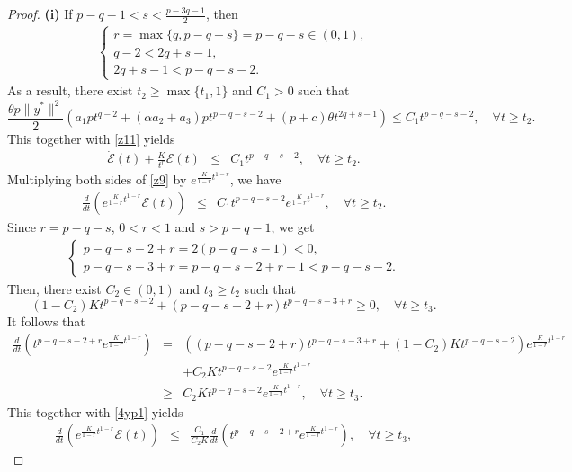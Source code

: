 \documentclass[review]{elsarticle}
\begin{document}
\begin{proof}
		{\bf (i)} If $p-q-1<s<\frac{p-3q-1}{2}$, then
		\begin{eqnarray*}
			\begin{cases}r=\max\{q, p-q-s\}=p-q-s\in (0,1),\\
				q-2<2q+s-1,\\
				2q+s-1<  p-q-s-2.
			\end{cases}
		\end{eqnarray*} 
As a result, there exist $t_2\geq\max\{t_1, 1\}$  and $C_1>0$ such that
		$$\frac{\theta p\|y^*\|^2}{2}\left(a_1pt^{q-2}+(\alpha a_2+a_3)pt^{p-q-s-2}+(p+c)\theta t^{2q+s-1}\right)\leq C_1t^{p-q-s-2}, \quad \forall t\geq t_2.$$
		This together with \eqref{z11} yields
		\begin{eqnarray}\label{z9}
			\dot{\mathcal{E}}(t)+\frac{K}{t^r}\mathcal{E}(t)
			&\leq&C_1 t^{p-q-s-2}, \quad \forall t\geq t_2.
		\end{eqnarray}	
		Multiplying both sides of \eqref{z9} by $e^{\frac{K}{1-r}t^{1-r}}$, we have 
		\begin{eqnarray}\label{4yp1}
			\frac{d}{dt}\left(e^{\frac{K}{1-r}t^{1-r}}\mathcal{E}(t)\right)
			&\leq&C_1 t^{p-q-s-2}e^{\frac{K}{1-r}t^{1-r}}, \quad \forall t\geq t_2.
		\end{eqnarray}	
		Since $r=p-q-s$, $0<r<1$ and $s>p-q-1$, we get
		\begin{eqnarray}\label{z10}
			\begin{cases}
				p-q-s-2+r=2(p-q-s-1)<0,\\
				p-q-s-3+r=p-q-s-2+r-1< p-q-s-2.
			\end{cases}
		\end{eqnarray} 
		Then, there exist  $C_2\in(0,1)$ and $t_3\geq t_2$ such that
		$$(1-C_2)Kt^{p-q-s-2}+(p-q-s-2+r)t^{p-q-s-3+r}\geq0, \quad \forall t\geq t_3.$$
	It follows that
		\begin{eqnarray*}
			\frac{d}{dt}\left(t^{p-q-s-2+r}e^{\frac{K}{1-r}t^{1-r}}\right)&=&\left((p-q-s-2+r)t^{p-q-s-3+r}+(1-C_2)Kt^{p-q-s-2}\right)e^{\frac{K}{1-r}t^{1-r}}\\
			&&+C_2Kt^{p-q-s-2}e^{\frac{K}{1-r}t^{1-r}}\\
			&\geq& C_2Kt^{p-q-s-2}e^{\frac{K}{1-r}t^{1-r}}, \quad \forall t\geq t_3.
		\end{eqnarray*}	
	This together with  \eqref{4yp1} yields
		\begin{eqnarray*}
			\frac{d}{dt}\left(e^{\frac{K}{1-r}t^{1-r}}\mathcal{E}(t)\right)
			&\leq&\frac{C_1}{C_2K}\frac{d}{dt}\left(t^{p-q-s-2+r}e^{\frac{K}{1-r}t^{1-r}}\right), \quad \forall t\geq t_3,
		\end{eqnarray*}	

\end{proof}
\end{document}
